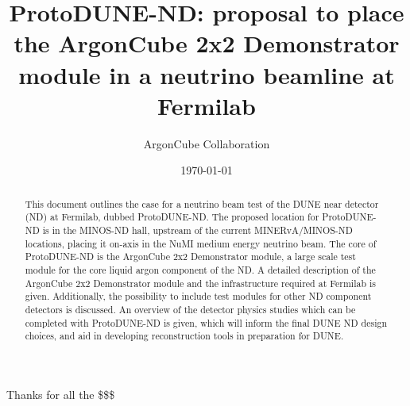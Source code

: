 \documentclass[aps,prd,preprint,superscriptaddress,nofootinbib]{revtex4-1}
\begin{document}
\title{ProtoDUNE-ND: proposal to place the ArgonCube 2x2 Demonstrator module in a neutrino beamline at Fermilab}

\author{ArgonCube Collaboration}

\date{\today}

\begin{abstract}
  This document outlines the case for a neutrino beam test of the DUNE near detector (ND) at Fermilab, dubbed ProtoDUNE-ND. The proposed location for ProtoDUNE-ND is in the MINOS-ND hall, upstream of the current MINERvA/MINOS-ND locations, placing it on-axis in the NuMI medium energy neutrino beam. The core of ProtoDUNE-ND is the ArgonCube 2x2 Demonstrator module, a large scale test module for the core liquid argon component of the ND.  A detailed description of the ArgonCube 2x2 Demonstrator module and the infrastructure required at Fermilab is given. Additionally, the possibility to include test modules for other ND component detectors is discussed. An overview of the detector physics studies which can be completed with ProtoDUNE-ND is given, which will inform the final DUNE ND design choices, and aid in developing reconstruction tools in preparation for DUNE.
  
\end{abstract}

\maketitle








\begin{acknowledgments}
Thanks for all the \$\$\$
\end{acknowledgments}


%
\end{document}
